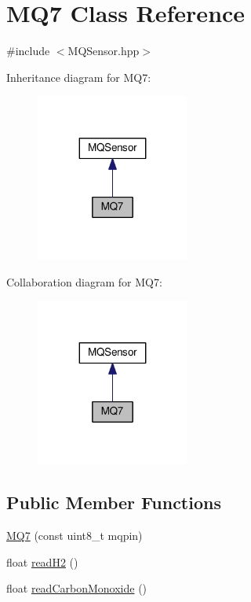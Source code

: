 \hypertarget{class_m_q7}{}\section{M\+Q7 Class Reference}
\label{class_m_q7}


{\ttfamily \#include $<$M\+Q\+Sensor.\+hpp$>$}



Inheritance diagram for M\+Q7\+:\nopagebreak
\begin{figure}[H]
\begin{center}
\leavevmode
\includegraphics[width=143pt]{class_m_q7__inherit__graph}
\end{center}
\end{figure}


Collaboration diagram for M\+Q7\+:\nopagebreak
\begin{figure}[H]
\begin{center}
\leavevmode
\includegraphics[width=143pt]{class_m_q7__coll__graph}
\end{center}
\end{figure}
\subsection*{Public Member Functions}
\begin{DoxyCompactItemize}
\item 
\hyperlink{class_m_q7_a883b2f95cfa65f7ab734057d0d8e4797}{M\+Q7} (const uint8\+\_\+t mqpin)
\item 
float \hyperlink{class_m_q7_a985699da69427048ea6a01720c79bc2e}{read\+H2} ()
\item 
float \hyperlink{class_m_q7_a3ce5efda2320dfb57667e37767b0d570}{read\+Carbon\+Monoxide} ()
\end{DoxyCompactItemize}
